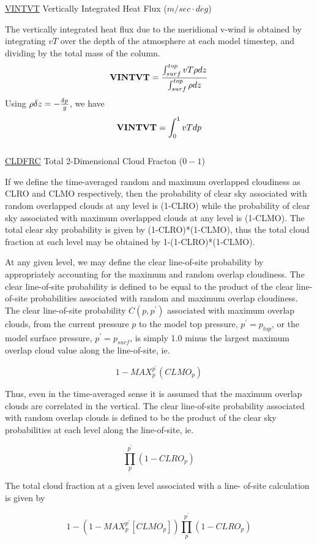\noindent
{ \underline {VINTVT} Vertically Integrated Heat Flux ($m/sec \cdot deg$) }

\noindent
The vertically integrated heat flux due to the meridional v-wind is obtained by integrating
$v T$ over the depth of the atmosphere at each model timestep, 
and dividing by the total mass of the column.
\[
{\bf VINTVT} = \frac{ \int_{surf}^{top} v T \rho dz  } { \int_{surf}^{top} \rho dz  }
\]
Using $\rho \delta z = -{\delta p \over g} $, we have 
\[
{\bf VINTVT} = { \int_0^1 v T dp  }
\]
\\

\noindent
{ \underline {CLDFRC} Total 2-Dimensional Cloud Fracton ($0-1$) }

If we define the
time-averaged random and maximum overlapped cloudiness as CLRO and
CLMO respectively, then the probability of clear sky associated 
with random overlapped clouds at any level is (1-CLRO) while the probability of
clear sky associated with maximum overlapped clouds at any level is (1-CLMO). 
The total clear sky probability is given by (1-CLRO)*(1-CLMO), thus
the total cloud fraction at each  level may be obtained by 
1-(1-CLRO)*(1-CLMO).

At any given level, we may define the clear line-of-site probability by
appropriately accounting for the maximum and random overlap
cloudiness.  The clear line-of-site probability is defined to be
equal to the product of the clear line-of-site probabilities
associated with random and maximum overlap cloudiness.  The clear
line-of-site probability $C(p,p^{\prime})$ associated with maximum overlap clouds, 
from the current pressure $p$ 
to the model top pressure, $p^{\prime} = p_{top}$, or the model surface pressure, $p^{\prime} = p_{surf}$,
is simply 1.0 minus the largest maximum overlap cloud value along  the
line-of-site, ie.

$$1-MAX_p^{p^{\prime}} \left( CLMO_p \right)$$

Thus, even in the time-averaged sense it is assumed that the
maximum overlap clouds are correlated in the vertical.  The clear
line-of-site probability associated with random overlap clouds is
defined to be the product of the clear sky probabilities at each
level along the line-of-site, ie. 

$$\prod_{p}^{p^{\prime}} \left( 1-CLRO_p \right)$$

The total cloud fraction at a given level associated with a line-
of-site calculation is given by

$$1-\left( 1-MAX_p^{p^{\prime}} \left[ CLMO_p \right] \right)
    \prod_p^{p^{\prime}} \left( 1-CLRO_p \right)$$


